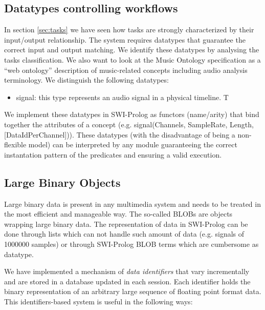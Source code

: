 \documentclass[runningheads]{llncs}
\begin{document}
\subsection{Datatypes controlling workflows}\label{subsec:datatypes}

In section \ref{sec:tasks} we have seen how tasks are strongly characterized by their input/output relationship. The system requires datatypes that guarantee the correct input and output matching. We identify these datatypes by analysing the tasks classification. We also want to look at the Music Ontology specification \cite{mo} as a ``web ontology'' description of music-related concepts including audio analysis terminology. We distinguish the following datatypes:

\begin{itemize}
 \item signal: this type represents an audio signal in a physical timeline. T
\end{itemize}


We implement these datatypes in SWI-Prolog as functors (name/arity) that bind together the attributes of a concept (e.g. signal(Channels, SampleRate, Length, [DataIdPerChannel])). These datatypes (with the disadvantage of being a non-flexible model) can be interpreted by any module guaranteeing the correct instantation pattern of the predicates and ensuring a valid execution.

\subsection{Large Binary Objects}\label{subsec:blobs}

Large binary data is present in any multimedia system and needs to be treated in the most efficient and manageable way. The so-called BLOBs are objects wrapping large binary data. The representation of data in SWI-Prolog can be done through lists which can not handle such amount of data (e.g. signals of 1000000 samples) or through SWI-Prolog BLOB terms which are cumbersome as datatype.

We have implemented a mechanism of \textit{data identifiers} that vary incrementally and are stored in a database updated in each session. Each identifier holds the binary representation of an arbitrary large sequence of floating point format data. This identifiers-based system is useful in the following ways:
\end{document}
